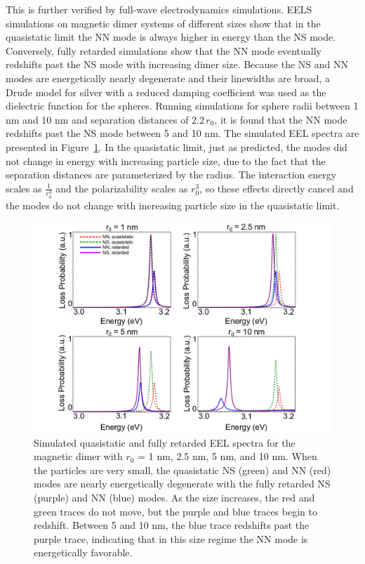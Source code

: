 \documentclass[journal=jpccck,manuscript=article]{achemso}
\begin{document}
This is further verified by full-wave electrodynamics simulations\cite{Hohenester2012}. EELS simulations on magnetic dimer systems of different sizes show that in the quasistatic limit the NN mode is always higher in energy than the NS mode. Conversely, fully retarded simulations show that the NN mode eventually redshifts past the NS mode with increasing dimer size. Because the NS and NN modes are energetically nearly degenerate and their linewidths are broad, a Drude model for silver with a reduced damping coefficient was used as the dielectric function for the spheres. Running simulations for sphere radii between 1 nm and 10 nm and separation distances of $2.2 \, r_0$, it is found that the NN mode redshifts past the NS mode between 5 and 10 nm. The simulated EEL spectra are presented in Figure~\ref{fig6}. In the quasistatic limit, just as predicted, the modes did not change in energy with increasing particle size, due to the fact that the separation distances are parameterized by the radius. The interaction energy scales as $\frac{1}{r_{0}^{3}}$ and the polarizability scales as $r_{0}^{3}$, so these effects directly cancel and the modes do not change with increasing particle size in the quasistatic limit.

\begin{figure}
  \begin{center}
  \includegraphics[trim = 0.8in 0 1.2in 0,clip=true,scale=0.5]{bem_spectra_3.png}
  \caption{Simulated quasistatic and fully retarded EEL spectra for the magnetic dimer with $r_0$ = 1 nm, 2.5 nm, 5 nm, and 10 nm. When the particles are very small, the quasistatic NS (green) and NN (red) modes are nearly energetically degenerate with the fully retarded NS (purple) and NN (blue) modes. As the size increases, the red and green traces do not move, but the purple and blue traces begin to redshift. Between 5 and 10 nm, the blue trace redshifts past the purple trace, indicating that in this size regime the NN mode is energetically favorable.}
  \label{fig6}
  \end{center}
\end{figure}
\end{document}
